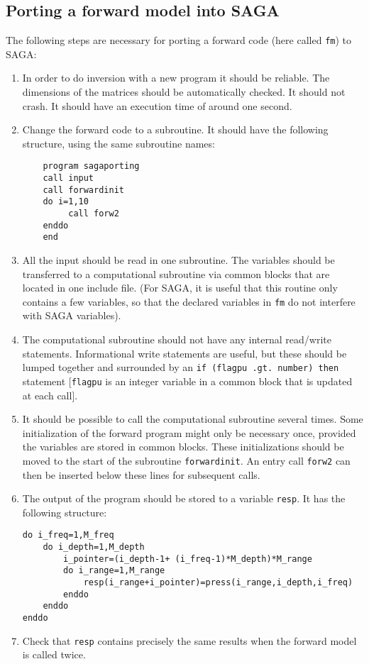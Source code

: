 \documentclass{saclantc}
\begin{document}
\subsection{Porting a forward model into SAGA}
The following steps are necessary for porting a 
forward code (here called {\tt fm}) to {\sf SAGA}:
\begin{enumerate}
\item In order to do inversion with a new program it should be reliable. The
dimensions of the matrices should be automatically checked. It should not
crash.
It should have an execution time of around one second.

\item Change the forward code to a subroutine.
 It should have the following structure, using the same subroutine
names:

\small
\begin{verbatim}
    program sagaporting
    call input
    call forwardinit
    do i=1,10
         call forw2
    enddo
    end
\end{verbatim}
\normalsize

\item All the input should be read in one subroutine. 
    The variables should be transferred to a computational 
    subroutine via common blocks that are located in one include
    file.
    (For {\sf SAGA}, it is useful that this routine only contains a few
    variables, so that the declared variables in {\tt fm} do not 
    interfere with {\sf SAGA} variables).

\item The computational subroutine should not have any internal
    read/write statements.  
    Informational write statements are useful, but these should be
    lumped together and surrounded by an   {\tt if (flagpu .gt.\ number)
then }
    statement [{\tt flagpu} is an integer variable in a common block 
that is updated at each call].  

\item  It should be possible to call the computational subroutine several
    times.
    Some initialization of the forward program might only be 
    necessary once, provided the variables are stored in common
    blocks. These initializations should be moved to the start of the
    subroutine {\tt forwardinit}.  An entry call {\tt forw2} 
    can then be inserted below these lines
    for subsequent calls.
\item The output of the program should be stored to a variable
    {\tt resp}. It has the following structure:
\small
\begin{verbatim}
do i_freq=1,M_freq
    do i_depth=1,M_depth
        i_pointer=(i_depth-1+ (i_freq-1)*M_depth)*M_range
        do i_range=1,M_range
            resp(i_range+i_pointer)=press(i_range,i_depth,i_freq)
        enddo
    enddo
enddo
\end{verbatim}
\normalsize

\item  Check that {\tt resp} contains precisely the same results when the forward model
    is called twice. 

\end{enumerate}
\end{document}
